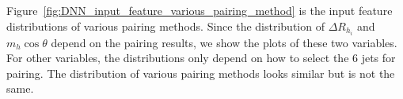 \documentclass[12pt]{article}
\begin{document}
        Figure~\ref{fig:DNN_input_feature_various_pairing_method} is the input feature distributions of various pairing methods. Since the distribution of $\Delta R_{h_i}$ and $m_{h} \cos\theta$ depend on the pairing results, we show the plots of these two variables. For other variables, the distributions only depend on how to select the 6 jets for pairing. The distribution of various pairing methods looks similar but is not the same.
        \begin{figure}[htpb]
            \centering
             \\
             \\
\end{figure}
\end{document}
